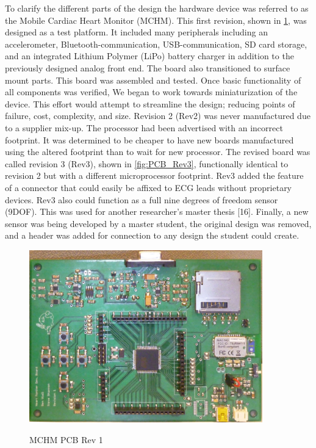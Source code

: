 To clarify the different parts of the design the hardware device was referred to as the Mobile Cardiac Heart Monitor (MCHM). This first revision, shown in \cref{fig:PCB_Rev1}, was designed as a test platform. It included many peripherals including an accelerometer, Bluetooth-communication, USB-communication, SD card storage, and an integrated  Lithium Polymer (LiPo) battery charger in addition to the previously designed analog front end. The board also transitioned to surface mount parts. This board was assembled and tested. Once basic functionality of all components was verified, We began to work towards miniaturization of the device. This effort would attempt to streamline the design; reducing points of failure, cost, complexity, and size.  Revision 2 (Rev2) was never manufactured due to a supplier mix-up. The processor had been advertised with an incorrect footprint. It was determined to be cheaper to have new boards manufactured using the altered footprint than to wait for new processor. The revised board was called revision 3 (Rev3), shown in \cref{fig:PCB_Rev3}, functionally identical to revision 2 but with a different microprocessor footprint. Rev3 added the feature of a connector that could easily be affixed to ECG leads without proprietary devices. Rev3 also could function as a full nine degrees of freedom sensor (9DOF). This was used for another researcher's master thesis [16]. Finally, a new  sensor was being developed by a master student, the original design was removed, and a header was added for connection to any design the student could create.

\begin{figure}
	\begin{center}
		\label{fig:PCB_Rev1}
		\includegraphics[scale=1,width=0.9\textwidth]{Images/PCB_Rev1.jpg} 
		\caption{MCHM PCB Rev 1}
	\end{center}
\end{figure}


